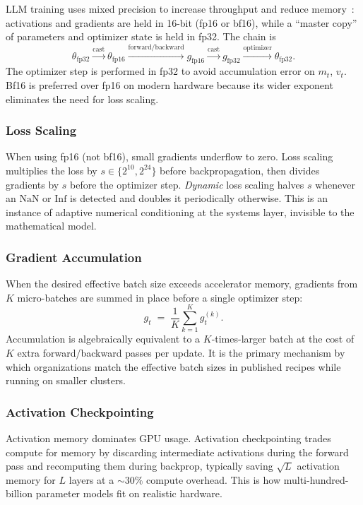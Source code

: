 LLM training uses mixed precision to increase throughput and reduce
memory~\citep{micikevicius2018mixed}: activations and gradients are held
in 16-bit (fp16 or bf16), while a ``master copy'' of parameters and
optimizer state is held in fp32. The chain is
\[
\theta_{\mathrm{fp32}} \xrightarrow{\text{cast}} \theta_{\mathrm{fp16}}
\xrightarrow{\text{forward/backward}} g_{\mathrm{fp16}}
\xrightarrow{\text{cast}} g_{\mathrm{fp32}}
\xrightarrow{\text{optimizer}} \theta_{\mathrm{fp32}}.
\]
The optimizer step is performed in fp32 to avoid accumulation error on
$m_t$, $v_t$. Bf16 is preferred over fp16 on modern hardware because its
wider exponent eliminates the need for loss scaling.

\subsubsection{Loss Scaling}

When using fp16 (not bf16), small gradients underflow to zero. Loss
scaling multiplies the loss by $s \in \{2^{10}, 2^{24}\}$ before
backpropagation, then divides gradients by $s$ before the optimizer
step. \emph{Dynamic} loss scaling halves $s$ whenever an $\mathrm{NaN}$
or $\mathrm{Inf}$ is detected and doubles it periodically otherwise.
This is an instance of adaptive numerical conditioning at the systems
layer, invisible to the mathematical model.

\subsubsection{Gradient Accumulation}

When the desired effective batch size exceeds accelerator memory,
gradients from $K$ micro-batches are summed in place before a single
optimizer step:
\[
g_t \;=\; \frac{1}{K}\sum_{k=1}^{K} g_t^{(k)}.
\]
Accumulation is algebraically equivalent to a $K$-times-larger batch at
the cost of $K$ extra forward/backward passes per update. It is the
primary mechanism by which organizations match the effective batch
sizes in published recipes while running on smaller clusters.

\subsubsection{Activation Checkpointing}

Activation memory dominates GPU usage. Activation checkpointing
\citep{chen2016training} trades compute for memory by discarding
intermediate activations during the forward pass and recomputing them
during backprop, typically saving $\sqrt{L}$ activation memory for $L$
layers at a $\sim 30\%$ compute overhead. This is how multi-hundred-billion
parameter models fit on realistic hardware.

